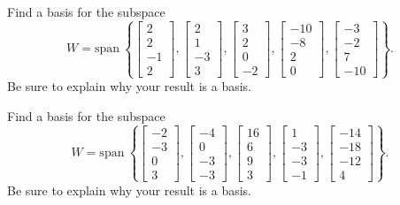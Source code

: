 \documentclass{article}
\begin{document}
\begin{exerciseStatement}
    Find a basis for the subspace
\[W=\mathrm{span}\ \left\{\left[\begin{array}{r}
2 \\
2 \\
-1 \\
2
\end{array}\right] , \left[\begin{array}{r}
2 \\
1 \\
-3 \\
3
\end{array}\right] , \left[\begin{array}{r}
3 \\
2 \\
0 \\
-2
\end{array}\right] , \left[\begin{array}{r}
-10 \\
-8 \\
2 \\
0
\end{array}\right] , \left[\begin{array}{r}
-3 \\
-2 \\
7 \\
-10
\end{array}\right]\right\}.\]
 Be sure to explain why your result is a basis.


  
\end{exerciseStatement}

\begin{exerciseStatement}
    Find a basis for the subspace
\[W=\mathrm{span}\ \left\{\left[\begin{array}{r}
-2 \\
-3 \\
0 \\
3
\end{array}\right] , \left[\begin{array}{r}
-4 \\
0 \\
-3 \\
-3
\end{array}\right] , \left[\begin{array}{r}
16 \\
6 \\
9 \\
3
\end{array}\right] , \left[\begin{array}{r}
1 \\
-3 \\
-3 \\
-1
\end{array}\right] , \left[\begin{array}{r}
-14 \\
-18 \\
-12 \\
4
\end{array}\right]\right\}.\]
 Be sure to explain why your result is a basis.


  
\end{exerciseStatement}
\end{document}

